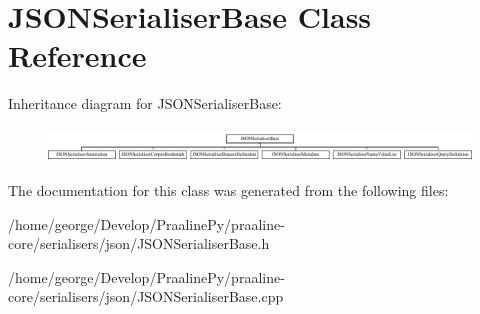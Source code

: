 \hypertarget{class_j_s_o_n_serialiser_base}{}\section{J\+S\+O\+N\+Serialiser\+Base Class Reference}
\label{class_j_s_o_n_serialiser_base}
Inheritance diagram for J\+S\+O\+N\+Serialiser\+Base\+:\begin{figure}[H]
\begin{center}
\leavevmode
\includegraphics[height=0.915033cm]{class_j_s_o_n_serialiser_base}
\end{center}
\end{figure}


The documentation for this class was generated from the following files\+:\begin{DoxyCompactItemize}
\item 
/home/george/\+Develop/\+Praaline\+Py/praaline-\/core/serialisers/json/J\+S\+O\+N\+Serialiser\+Base.\+h\item 
/home/george/\+Develop/\+Praaline\+Py/praaline-\/core/serialisers/json/J\+S\+O\+N\+Serialiser\+Base.\+cpp\end{DoxyCompactItemize}
